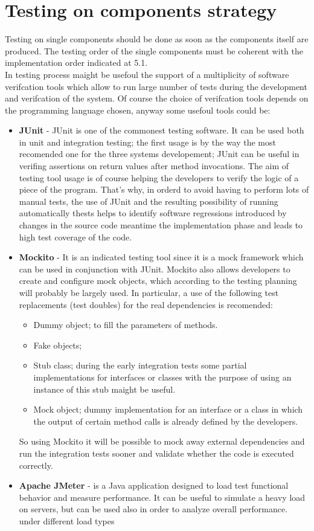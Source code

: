 \section{Testing on components strategy}
Testing on single components should be done as soon as the components itself are produced. The testing order of the single components must be coherent with the implementation order indicated at 5.1. \\ 
In testing process maight be usefoul the support of a multiplicity of software verifcation tools which allow to run large number of tests during the development and verifcation of the system. Of course the choice of verifcation tools depends on the programming language chosen, anyway some usefoul tools could be:
\begin{itemize}
\item \textbf{JUnit} - JUnit is one of the commonest testing software. It can be used both in unit and integration testing; the first usage is by  the way the most recomended one for the three systems developement; JUnit can be useful in verifing assertions on return values after method invocations. The aim of testing tool usage is of course helping the developers to verify the logic of a piece of the program. That's why, in orderd to avoid having to perform lots of manual tests, the use of JUnit and the resulting possibility of running automatically thests helps to identify software regressions introduced by changes in the source code meantime the implementation phase and leads to high test coverage of the code.

\item \textbf{Mockito} - It is an indicated testing tool since it is a mock framework which can be used in conjunction with JUnit. Mockito also allows developers to create and configure mock objects, which according to the testing planning will probably be largely used. In particular, a use of the following test replacements (test doubles) for the real dependencies is recomended:
\begin{itemize}
\item Dummy object; to fill the parameters of methods.

\item Fake objects; 

\item Stub class; during the early integration tests some partial implementations for interfaces or classes with the purpose of using an instance of this stub maight be useful.

\item Mock object; dummy implementation for an interface or a class in which the output of certain method calls is already defined by the developers. 
\end{itemize}
So using Mockito it will be possible to mock away external dependencies and run the integration tests sooner and validate whether the code is executed correctly.

\item \textbf{Apache JMeter} - is a Java application designed to load test functional behavior and measure performance. It can be useful to simulate a heavy load on servers, but can be used also in order to analyze overall performance.
under different load types
\end{itemize}
